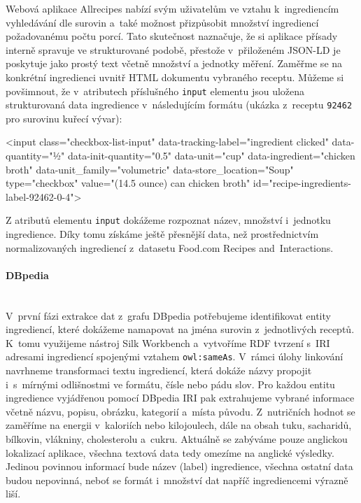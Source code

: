 Webová aplikace Allrecipes nabízí svým uživatelům ve vztahu k~ingrediencím vyhledávání dle surovin a~také možnost přizpůsobit množství ingrediencí požadovanému počtu porcí. Tato skutečnost naznačuje, že si aplikace přísady interně spravuje ve strukturované podobě, přestože v~přiloženém JSON-LD je poskytuje jako prostý text včetně množství a jednotky měření. Zaměřme se na konkrétní ingredienci uvnitř HTML dokumentu vybraného receptu. Můžeme si povšimnout, že v~atributech příslušného \texttt{input} elementu jsou uložena strukturovaná data ingredience v~následujícím formátu (ukázka z~receptu \texttt{92462} pro surovinu kuřecí vývar):

\begin{code}
<input
    class="checkbox-list-input"
    data-tracking-label="ingredient clicked"
    data-quantity="½"
    data-init-quantity="0.5"
    data-unit="cup"
    data-ingredient="chicken broth"
    data-unit_family="volumetric"
    data-store_location="Soup"
    type="checkbox"
    value="(14.5 ounce) can chicken broth"
    id="recipe-ingredients-label-92462-0-4">
\end{code}

Z atributů elementu \texttt{input} dokážeme rozpoznat název, množství i~jednotku ingredience. Díky tomu získáme ještě přesnější data, než prostřednictvím normalizovaných ingrediencí z~datasetu Food.com Recipes and~Interactions.

\paragraph{DBpedia}\mbox{}\\

V~první fázi extrakce dat z~grafu DBpedia potřebujeme identifikovat entity ingrediencí, které dokážeme namapovat na jména surovin z~jednotlivých receptů. K~tomu využijeme nástroj Silk Workbench a~vytvoříme RDF tvrzení s~IRI adresami ingrediencí spojenými vztahem \texttt{owl:sameAs}. V~rámci úlohy linkování navrhneme transformaci textu ingrediencí, která dokáže názvy propojit i~s~mírnými odlišnostmi ve formátu, čísle nebo pádu slov. Pro každou entitu ingredience vyjádřenou pomocí DBpedia IRI pak extrahujeme vybrané informace včetně názvu, popisu, obrázku, kategorií a~místa původu. Z~nutričních hodnot se zaměříme na energii v~kaloriích nebo kilojoulech, dále na obsah tuku, sacharidů, bílkovin, vlákniny, cholesterolu a~cukru. Aktuálně se zabýváme pouze anglickou lokalizací aplikace, všechna textová data tedy omezíme na anglické výsledky. Jedinou povinnou informací bude název (label) ingredience, všechna ostatní data budou nepovinná, neboť se formát i~množství dat napříč ingrediencemi výrazně liší.

